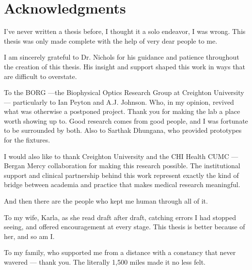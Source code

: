 \chapter*{Acknowledgments} 

I've never written a thesis before, I thought it a solo endeavor, I was wrong. This thesis was only made complete with the help of very dear people to me.

I am sincerely grateful to Dr. Nichols for his guidance and patience throughout the creation of this thesis. His insight and support shaped this work in ways that are difficult to overstate. 

To the BORG ---the Biophysical Optics Research Group at Creighton University--- particularly to Ian Peyton and A.J. Johnson. Who, in my opinion, revived what was otherwise a postponed project. Thank you for making the lab a place worth showing up to. Good research comes from good people, and I was fortunate to be surrounded by both. Also to Sarthak Dhungana, who provided prototypes for the fixtures.

I would also like to thank Creighton University and the CHI Health CUMC --- Bergan Mercy collaboration for making this research possible. The institutional support and clinical partnership behind this work represent exactly the kind of bridge between academia and practice that makes medical research meaningful.

And then there are the people who kept me human through all of it.

To my wife, Karla, as she read draft after draft, catching errors I had stopped seeing, and offered encouragement at every stage. This thesis is better because of her, and so am I.

To my family, who supported me from a distance with a constancy 
that never wavered --- thank you. The literally 1,500 miles made it no less felt.






